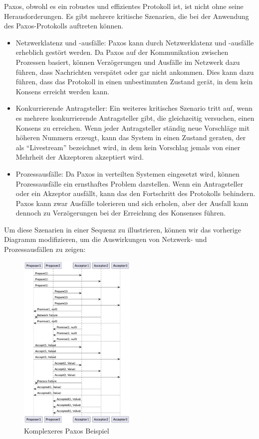 Paxos, obwohl es ein robustes und effizientes Protokoll ist, ist nicht ohne seine Herausforderungen. Es gibt mehrere kritische Szenarien, die bei der Anwendung des Paxos-Protokolls auftreten können.
\begin{itemize}
\item Netzwerklatenz und -ausfälle: Paxos kann durch Netzwerklatenz und -ausfälle erheblich gestört werden. Da Paxos auf der Kommunikation zwischen Prozessen basiert, können Verzögerungen und Ausfälle im Netzwerk dazu führen, dass Nachrichten verspätet oder gar nicht ankommen. Dies kann dazu führen, dass das Protokoll in einen unbestimmten Zustand gerät, in dem kein Konsens erreicht werden kann.
\item Konkurrierende Antragsteller: Ein weiteres kritisches Szenario tritt auf, wenn es mehrere konkurrierende Antragsteller gibt, die gleichzeitig versuchen, einen Konsens zu erreichen. Wenn jeder Antragsteller ständig neue Vorschläge mit höheren Nummern erzeugt, kann das System in einen Zustand geraten, der als \enquote{Livestream} bezeichnet wird, in dem kein Vorschlag jemals von einer Mehrheit der Akzeptoren akzeptiert wird.
\item Prozessausfälle: Da Paxos in verteilten Systemen eingesetzt wird, können Prozessausfälle ein ernsthaftes Problem darstellen. Wenn ein Antragsteller oder ein Akzeptor ausfällt, kann das den Fortschritt des Protokolls behindern. Paxos kann zwar Ausfälle tolerieren und sich erholen, aber der Ausfall kann dennoch zu Verzögerungen bei der Erreichung des Konsenses führen.
\end{itemize}

Um diese Szenarien in einer Sequenz zu illustrieren, können wir das vorherige Diagramm modifizieren, um die Auswirkungen von Netzwerk- und Prozessausfällen zu zeigen:


\begin{figure}[!ht]
  \centering
  \includegraphics[width=0.5\textwidth]{fig/uml/paxos-issue}
  \caption{Komplexeres Paxos Beispiel}
  \label{fig:simple-paxos-issue}
\end{figure}

